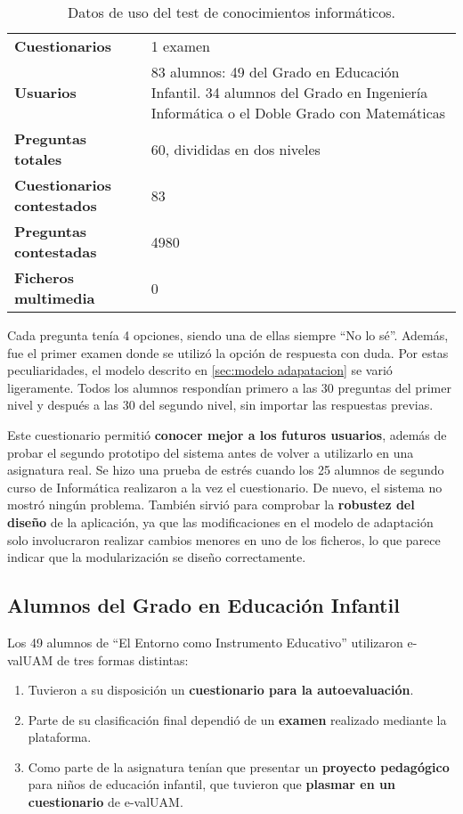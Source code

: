 \begin{table}[hc]
	\centering
	\begin{tabular}{l|p{10cm}}
		{\bf Cuestionarios}             & 1 examen \\ 
		{\bf Usuarios}                  & 83 alumnos: 49 del Grado en Educación Infantil. 34 alumnos del Grado en Ingeniería Informática o el Doble Grado con Matemáticas \\
		{\bf Preguntas totales}         & 60, divididas en dos niveles    \\ 
		{\bf Cuestionarios contestados} & 83                              \\ 
		{\bf Preguntas contestadas}     & 4980                             \\ 
		{\bf Ficheros multimedia}		& 0							   \\
	\end{tabular}
	\caption{Datos de uso del test de conocimientos inform\'aticos.}
\end{table}

Cada pregunta tenía 4 opciones, siendo una de ellas siempre ``No lo sé''. Además, fue el primer examen donde se utilizó la opción de respuesta con duda. Por estas peculiaridades, el modelo descrito en \ref{sec:modelo adapatacion} se varió ligeramente. Todos los alumnos respondían primero a las 30 preguntas del primer nivel y después a las 30 del segundo nivel, sin importar las respuestas previas.

Este cuestionario permitió \textbf{conocer mejor a los futuros usuarios}, además de probar el segundo prototipo del sistema antes de volver a utilizarlo en una asignatura real. Se hizo una prueba de estrés cuando los 25 alumnos de segundo curso de Informática realizaron a la vez el cuestionario. De nuevo, el sistema no mostró ningún problema. También sirvió para comprobar la \textbf{robustez del diseño} de la aplicación, ya que las modificaciones en el modelo de adaptación solo involucraron realizar cambios menores en uno de los ficheros, lo que parece indicar que la modularización se diseño correctamente.

\subsection{Alumnos del Grado en Educación Infantil}

Los 49 alumnos de ``El Entorno como Instrumento Educativo'' utilizaron \acrshort{e-valUAM} de tres formas distintas:

\begin{enumerate}
 	\item Tuvieron a su disposición un \textbf{cuestionario para la autoevaluación}. 
 	\item Parte de su clasificación final dependió de un \textbf{examen} realizado mediante la plataforma. 
 	\item Como parte de la asignatura tenían que presentar un \textbf{proyecto pedagógico} para niños de educación infantil, que tuvieron que \textbf{plasmar en un cuestionario} de \acrshort{e-valUAM}. 
\end{enumerate}


